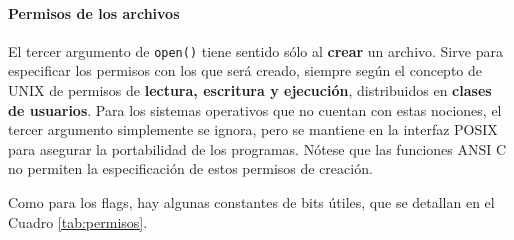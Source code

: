 \paragraph{Permisos de los archivos}
El tercer argumento de \lstinline{open()} tiene sentido sólo al \textbf{crear} un archivo. Sirve
para especificar los permisos con los que será creado, siempre según el
concepto de UNIX de permisos de \textbf{lectura, escritura y ejecución}, distribuidos en
\textbf{clases de usuarios}. Para los sistemas operativos que no cuentan con estas
nociones, el tercer argumento simplemente se ignora, pero se mantiene en la
interfaz POSIX para asegurar la portabilidad de los programas. Nótese que las funciones ANSI C no permiten la especificación de estos permisos de creación.

Como para los flags, hay algunas constantes de bits útiles, que se detallan en el Cuadro \ref{tab:permisos}.

% 


